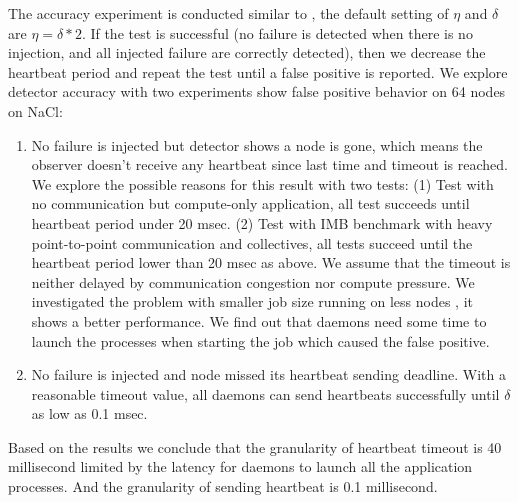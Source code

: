 \documentclass[sigconf]{acmart}
\begin{document}
The accuracy experiment is conducted similar to \cite{George16}, the default setting of $ \eta $ and $ \delta $ are $ \eta = \delta * 2 $. If the test is successful (no failure is detected when there is no injection, and all injected failure are correctly detected), then we decrease the heartbeat period and repeat the test until a false positive is reported. We explore detector accuracy with two experiments show false positive behavior on 64 nodes on NaCl: 
\begin{enumerate}
  \item No failure is injected but detector shows a node is gone, which means the observer doesn't receive any heartbeat since last time and timeout is reached. We explore the possible reasons for this result with two tests: (1) Test with no communication but compute-only application, all test succeeds until heartbeat period under 20 msec. (2) Test with IMB benchmark with heavy point-to-point communication and collectives, all tests succeed until the heartbeat period lower than 20 msec as above. We assume that the timeout is neither delayed by communication congestion nor compute pressure. We investigated the problem with smaller job size running on less nodes , it shows a better performance. We find out that daemons need some time to launch the processes when starting the job which caused the false positive. 
  \item No failure is injected and node missed its heartbeat sending deadline. With a reasonable timeout value, all daemons can send heartbeats successfully until $ \delta $ as low as 0.1 msec. 
\end{enumerate}

Based on the results we conclude that the granularity of heartbeat timeout is 40 millisecond limited by the latency for daemons to launch all the application processes. And the granularity of sending heartbeat is 0.1 millisecond.  
\end{document}
